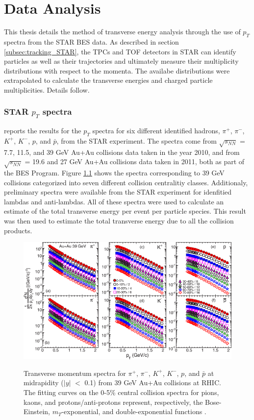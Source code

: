 \chapter{Data Analysis} \label{ch:analysis}
This thesis details the method of transverse energy analysis through the use of $p_{T}$ spectra from the STAR BES data. As described in section \ref{subsec:tracking_STAR}, the TPCs and TOF detectors in STAR can identify particles as well as their trajectories and ultimately measure their multiplicity distributions with respect to the momenta. The availabe distributions were extrapolated to calculate the transverse energies and charged particle multiplicities. Details follow.

\subsection{STAR $p_{T}$ spectra}
\citet{PhysRevC.96.044904} reports the results for the $p_{T}$ spectra for six different identified hadrons, $\pi^+$, $\pi^-$, $K^+$, $K^-$, $p$, and $\bar{p}$, from the STAR experiment. The spectra come from $\sqrt{s_{NN}}$ = 7.7, 11.5, and 39 GeV Au+Au collisions data taken in the year 2010, and from $\sqrt{s_{NN}}$ = 19.6 and 27 GeV Au+Au collisions data taken in 2011, both as part of the BES Program. Figure \ref{fig:BESPaper_pTSpectra} \cite{PhysRevC.96.044904} shows the spectra corresponding to 39 GeV collisions categorized into seven different collision centralitiy classes. Additionaly, preliminary spectra were available from the STAR experiment for idenfitied lambdas and anti-lambdas. All of these spectra were used to calculate an estimate of the total transverse energy per event per particle species. This result was then used to estimate the total transverse energy due to all the collision products.
\begin{figure}[h]
  \centering
  \includegraphics[width=6.5in]{../figures/PhysRevC-96-044904_pTSpectra_39.png}\\
  \caption{Transverse momentum spectra for $\pi^{+}$, $\pi^{-}$, $K^+$, $K^{-}$, $p$, and $\bar{p}$ at midrapidity ($|y|$ $<$ 0.1) from 39 GeV Au+Au collisions at RHIC. The fitting curves on the 0-5\% central collision spectra for pions, kaons, and protons/anti-protons represent, respectively, the Bose-Einstein, $m_{T}$-exponential, and double-exponential functions \cite{PhysRevC.96.044904}.}\label{fig:BESPaper_pTSpectra}
\end{figure}

